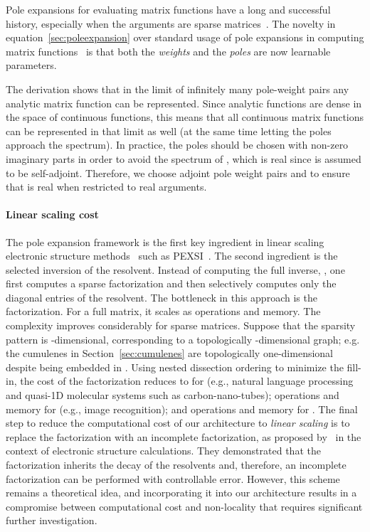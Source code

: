\documentclass{article} \usepackage{iclr2024_conference,times}
\def\eqref#1{equation~\ref{#1}}
\begin{document}
Pole expansions for evaluating matrix functions have a long and successful history, especially when the arguments are sparse matrices~\citep{higham2008functions}.
The novelty in \eqref{sec:poleexpansion} over standard usage of pole expansions in computing matrix functions~\citep{higham2008functions} is that both the {\em weights}  and the {\em poles}  are now learnable parameters.

The derivation shows that in the limit of infinitely many pole-weight pairs  any analytic matrix function can be represented. Since analytic functions are dense in the space of continuous functions, this means that all continuous matrix functions can be represented in that limit as well (at the same time letting the poles approach the spectrum).
In practice, the poles should be chosen with non-zero imaginary parts in order to avoid the spectrum of , which is real since  is assumed to be self-adjoint. Therefore, we choose adjoint pole weight pairs  and  to ensure that  is real when restricted to real arguments. 


\paragraph{Linear scaling cost}
The pole expansion framework is the first key ingredient in linear scaling electronic structure methods~\cite{RevModPhys.71.1085} such as PEXSI~\cite{pexsi_CMS2009,pexsi_JCPM2013}.
The second ingredient is the selected inversion of the resolvent. 
Instead of computing the full inverse, , one first computes a sparse  factorization and then selectively computes only the diagonal entries of the resolvent. The bottleneck in this approach is the  factorization. For a full matrix, it scales as  operations and  memory. 
The complexity improves considerably for sparse matrices. Suppose that the sparsity pattern is -dimensional, corresponding to a topologically -dimensional graph; e.g. the cumulenes in Section~\ref{sec:cumulenes} are topologically one-dimensional despite being embedded in . Using nested dissection ordering to minimize the fill-in, the cost of the  factorization reduces to  for  (e.g., natural language processing and quasi-1D molecular systems such as carbon-nano-tubes);  operations and  memory for  (e.g., image recognition); and  operations and  memory for . The final step to reduce the computational cost of our architecture to {\em linear scaling} is to replace the  factorization with an incomplete factorization, as proposed by~\citet{etter2020incomplete} in the context of electronic structure calculations. They demonstrated that the  factorization inherits the decay of the resolvents and, therefore, an incomplete factorization can be performed with controllable error. However, this scheme remains a theoretical idea, and incorporating it into our architecture results in a compromise between computational cost and non-locality that requires significant further investigation.
\end{document}
